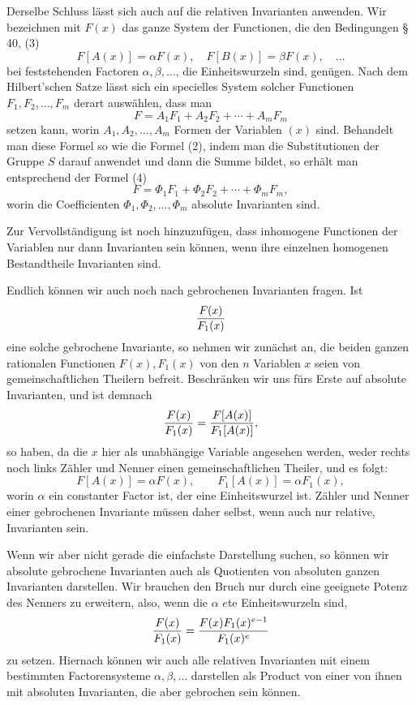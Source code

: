 \documentclass[11pt]{article}
\begin{document}
Derselbe Schluss lässt sich auch auf die relativen Invarianten anwenden. Wir bezeichnen mit $F(x)$ das ganze System der Functionen, die den Bedingungen \S\,40, (3)
\[
F[A(x)]=\alpha F(x),
\quad
F[B(x)]=\beta F(x),
\quad\ldots
\]
bei feststehenden Factoren $\alpha,\beta,\ldots$, die Einheitswurzeln sind, genügen. Nach dem Hilbert'schen Satze lässt sich ein specielles System solcher Functionen $F_1,F_2,\ldots,F_m$ derart auswählen, dass man
\begin{equation}
F=A_1F_1+A_2F_2+\cdots+A_mF_m
\tag{5}
\end{equation}
setzen kann, worin $A_1,A_2,\ldots,A_m$ Formen der Variablen $(x)$ sind. Behandelt man diese Formel so wie die Formel (2), indem man die Substitutionen der Gruppe $S$ darauf anwendet und dann die Summe bildet, so erhält man entsprechend der Formel (4)
\[
F=\Phi_1F_1+\Phi_2F_2+\cdots+\Phi_mF_m,
\]
worin die Coefficienten $\Phi_1,\Phi_2,\ldots,\Phi_m$ absolute Invarianten sind.

Zur Vervollständigung ist noch hinzuzufügen, dass inhomogene Functionen der Variablen nur dann Invarianten sein können, wenn ihre einzelnen homogenen Bestandtheile Invarianten sind.

Endlich können wir auch noch nach gebrochenen Invarianten fragen. Ist
\[
{F(x)\over F_1(x)}
\]
eine solche gebrochene Invariante, so nehmen wir zunächst an, die beiden ganzen rationalen Functionen $F(x),F_1(x)$ von den $n$ Variablen $x$ seien von gemeinschaftlichen Theilern befreit. Beschränken wir uns fürs Erste auf absolute Invarianten, und ist demnach
\[
{F(x)\over F_1(x)}={F[A(x)]\over F_1[A(x)]},
\]
so haben, da die $x$ hier als unabhängige Variable angesehen werden, weder rechts noch links Zähler und Nenner einen gemeinschaftlichen Theiler, und es folgt:
\[
F[A(x)]=\alpha F(x),\qquad F_1[A(x)]=\alpha F_1(x),
\]
worin $\alpha$ ein constanter Factor ist, der eine Einheitswurzel ist. Zähler und Nenner einer gebrochenen Invariante müssen daher selbst, wenn auch nur relative, Invarianten sein.

Wenn wir aber nicht gerade die einfachste Darstellung suchen, so können wir absolute gebrochene Invarianten auch als Quotienten von absoluten ganzen Invarianten darstellen. Wir brauchen den Bruch nur durch eine geeignete Potenz des Nenners zu erweitern, also, wenn die $\alpha$ $e$te Einheitswurzeln sind,
\[
{F(x)\over F_1(x)}={F(x)F_1(x)^{e-1}\over F_1(x)^e}
\]
zu setzen. Hiernach können wir auch alle relativen Invarianten mit einem bestimmten Factorensysteme $\alpha,\beta,\ldots$ darstellen als Product von einer von ihnen mit absoluten Invarianten, die aber gebrochen sein können.
\end{document}
